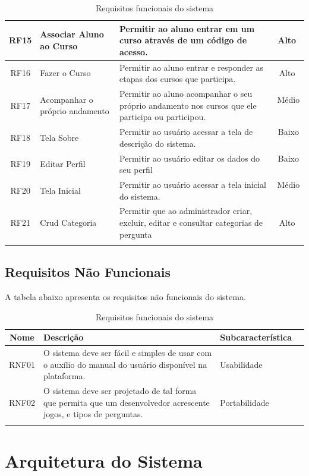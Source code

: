 \begin{center}
\begin{longtable}{c|p{4cm}|p{8cm}|c}
\hline RF15 & Associar Aluno ao Curso & Permitir ao aluno entrar em um curso através de um código de acesso. & Alto ﻿\\
\hline RF16 & Fazer o Curso & Permitir ao aluno entrar e responder as etapas dos cursos que participa. & Alto ﻿\\
\hline RF17 & Acompanhar o próprio andamento & Permitir ao aluno acompanhar o seu próprio andamento nos cursos que ele participa ou participou. & Médio ﻿\\
\hline RF18 & Tela Sobre & Permitir ao usuário acessar a tela de descrição do sistema. & Baixo ﻿\\
\hline RF19 & Editar Perfil & Permitir ao usuário editar os dados do seu perfil & Baixo ﻿\\
\hline RF20 & Tela Inicial & Permitir ao usuário acessar a tela inicial do sistema. & Médio ﻿\\
\hline RF21 & Crud Categoria & Permitir que ao administrador criar, excluir, editar e consultar categorias de pergunta & Alto ﻿\\
\hline
\caption{Requisitos funcionais do sistema}
\end{longtable}
\end{center}


\subsection{Requisitos Não Funcionais}

A tabela abaixo apresenta os requisitos não funcionais do sistema.

\begin{center}
\begin{longtable}{c|p{9cm}|p{4cm}|c}
\hline
\textbf{Nome} & \textbf{Descrição} & \textbf{Subcaracterística} \\
\hline RNF01 & O sistema deve ser fácil e simples de usar com o auxílio do manual do usuário disponível na plataforma. & Usabilidade  \\
\hline RNF02 & O sistema deve ser projetado de tal forma que permita que um desenvolvedor acrescente jogos, e tipos de perguntas. & Portabilidade  \\
\hline
\caption{Requisitos funcionais do sistema}
\end{longtable}
\end{center}

\section{Arquitetura do Sistema}
\label{sc:arquitetura}

